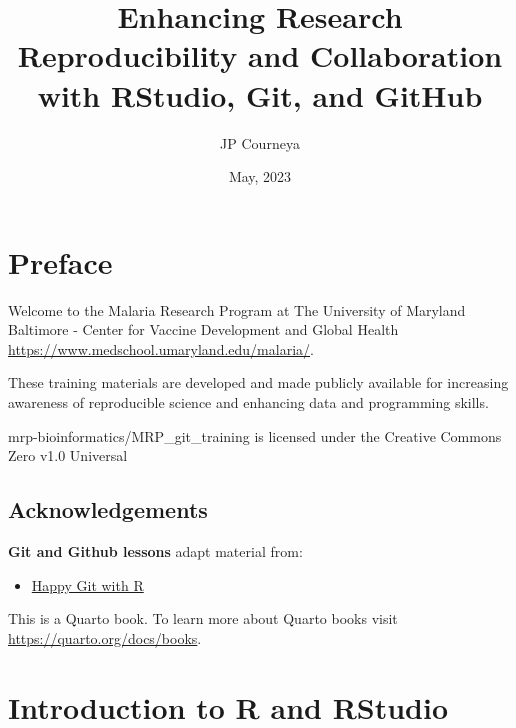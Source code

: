 \documentclass[
  letterpaper,
  DIV=11,
  numbers=noendperiod]{scrreprt}
\title{Enhancing Research Reproducibility and Collaboration with
RStudio, Git, and GitHub}
\author{JP Courneya}
\date{May, 2023}
\providecommand{\tightlist}{%
  \setlength{\itemsep}{0pt}\setlength{\parskip}{0pt}}\usepackage{longtable,booktabs,array}
\renewcommand*\contentsname{Table of contents}
\newcommand\contentsname{Table of contents}
\begin{document}
\maketitle
\ifdefined\Shaded\renewenvironment{Shaded}{\begin{tcolorbox}[boxrule=0pt, frame hidden, breakable, sharp corners, borderline west={3pt}{0pt}{shadecolor}, enhanced, interior hidden]}{\end{tcolorbox}}\fi

\renewcommand*\contentsname{Table of contents}
{
\hypersetup{linkcolor=}
\setcounter{tocdepth}{2}
\tableofcontents
}

\hypertarget{preface}{%
\chapter*{Preface}\label{preface}}


Welcome to the Malaria Research Program at The University of Maryland
Baltimore - Center for Vaccine Development and Global Health
\url{https://www.medschool.umaryland.edu/malaria/}.

These training materials are developed and made publicly available for
increasing awareness of reproducible science and enhancing data and
programming skills.

mrp-bioinformatics/MRP\_git\_training is licensed under the Creative
Commons Zero v1.0 Universal

\hypertarget{acknowledgements}{%
\section*{Acknowledgements}\label{acknowledgements}}


\textbf{Git and Github lessons} adapt material from:

\begin{itemize}
\tightlist
\item
  \href{https://happygitwithr.com/}{Happy Git with R}
\end{itemize}

This is a Quarto book. To learn more about Quarto books visit
\url{https://quarto.org/docs/books}.


\hypertarget{introduction-to-r-and-rstudio}{%
\chapter{Introduction to R and
RStudio}\label{introduction-to-r-and-rstudio}}
\end{document}
